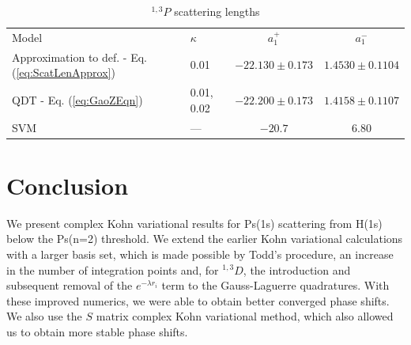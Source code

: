 \documentclass[preprint,showpacs,showkeys,preprintnumbers,amsmath,amssymb,longbibliography,pra,aps]{revtex4-1}
\begin{document}
\begin{table}[H]
\begin{center}
\begin{ruledtabular}
\begin{tabular}{l l c c}
Model & $\kappa$ & $a_1^+$ & $a_1^-$ \\
\colrule
Approximation to def. - Eq. (\ref{eq:ScatLenApprox}) & 0.01 & $-22.130 \pm 0.173$ & $1.4530 \pm 0.1104$ \\
QDT - Eq. (\ref{eq:GaoZEqn}) & 0.01, 0.02 & $-22.200 \pm 0.173$ & $1.4158 \pm 0.1107$ \\
\colrule
SVM \cite{Ivanov2002} & --- & $-20.7$ & $6.80$ 
\end{tabular}
\end{ruledtabular}
\caption{$^{1,3}P$ scattering lengths}
\label{tab:PWaveScatLen}
\end{center}
\end{table}


\section{Conclusion}

We present complex Kohn variational results for Ps(1s) scattering from H(1s) 
below the Ps(n=2) threshold. We extend the earlier Kohn variational 
calculations \cite{VanReeth2003,VanReeth2004} with a larger basis set, which 
is made possible by Todd's procedure,
an increase in the number of integration points and, for
$^{1,3}D$, the introduction and subsequent removal of the $e^{-\lambda r_i}$
term to the Gauss-Laguerre quadratures. With these improved numerics, we were
able to obtain better converged phase shifts.
We also use the $S$ matrix complex Kohn variational method, which also allowed
us to obtain more stable phase shifts.

\end{document}
